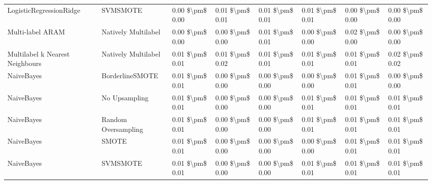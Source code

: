 \begin{tabular}{llllllll}
        LogisticRegressionRidge &                      SVMSMOTE & 0.00 \$\textbackslash pm\$ 0.00 &           0.01 \$\textbackslash pm\$ 0.01 &       0.01 \$\textbackslash pm\$ 0.01 &        0.01 \$\textbackslash pm\$ 0.01 &                         0.00 \$\textbackslash pm\$ 0.00 &     0.00 \$\textbackslash pm\$ 0.00 \\
               Multi-label ARAM &           Natively Multilabel & 0.00 \$\textbackslash pm\$ 0.00 &           0.00 \$\textbackslash pm\$ 0.00 &       0.01 \$\textbackslash pm\$ 0.01 &        0.00 \$\textbackslash pm\$ 0.00 &                         0.02 \$\textbackslash pm\$ 0.00 &     0.00 \$\textbackslash pm\$ 0.00 \\
Multilabel k Nearest Neighbours &           Natively Multilabel & 0.01 \$\textbackslash pm\$ 0.01 &           0.01 \$\textbackslash pm\$ 0.02 &       0.01 \$\textbackslash pm\$ 0.01 &        0.01 \$\textbackslash pm\$ 0.01 &                         0.01 \$\textbackslash pm\$ 0.01 &     0.02 \$\textbackslash pm\$ 0.02 \\
                     NaiveBayes &               BorderlineSMOTE & 0.01 \$\textbackslash pm\$ 0.01 &           0.00 \$\textbackslash pm\$ 0.00 &       0.00 \$\textbackslash pm\$ 0.00 &        0.00 \$\textbackslash pm\$ 0.00 &                         0.01 \$\textbackslash pm\$ 0.01 &     0.00 \$\textbackslash pm\$ 0.00 \\
                     NaiveBayes &                 No Upsampling & 0.01 \$\textbackslash pm\$ 0.01 &           0.00 \$\textbackslash pm\$ 0.00 &       0.00 \$\textbackslash pm\$ 0.00 &        0.01 \$\textbackslash pm\$ 0.01 &                         0.01 \$\textbackslash pm\$ 0.01 &     0.01 \$\textbackslash pm\$ 0.01 \\
                     NaiveBayes &           Random Oversampling & 0.01 \$\textbackslash pm\$ 0.01 &           0.00 \$\textbackslash pm\$ 0.00 &       0.00 \$\textbackslash pm\$ 0.00 &        0.01 \$\textbackslash pm\$ 0.01 &                         0.01 \$\textbackslash pm\$ 0.01 &     0.01 \$\textbackslash pm\$ 0.01 \\
                     NaiveBayes &                         SMOTE & 0.01 \$\textbackslash pm\$ 0.01 &           0.00 \$\textbackslash pm\$ 0.00 &       0.00 \$\textbackslash pm\$ 0.00 &        0.00 \$\textbackslash pm\$ 0.00 &                         0.01 \$\textbackslash pm\$ 0.01 &     0.01 \$\textbackslash pm\$ 0.01 \\
                     NaiveBayes &                      SVMSMOTE & 0.01 \$\textbackslash pm\$ 0.01 &           0.00 \$\textbackslash pm\$ 0.00 &       0.00 \$\textbackslash pm\$ 0.00 &        0.01 \$\textbackslash pm\$ 0.01 &                         0.01 \$\textbackslash pm\$ 0.01 &     0.01 \$\textbackslash pm\$ 0.01 \\

\end{tabular}
